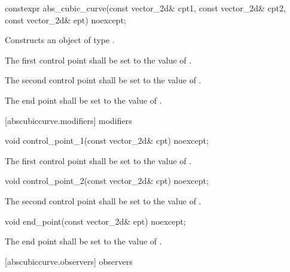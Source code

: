 \begin{itemdecl}
constexpr abs_cubic_curve(const vector_2d& cpt1, const vector_2d& cpt2,
  const vector_2d& ept) noexcept;
\end{itemdecl}
\begin{itemdescr}
\pnum
\effects
Constructs an object of type .

\pnum
The first control point shall be set to the value of .

\pnum
The second control point shall be set to the value of .

\pnum
The end point shall be set to the value of .
\end{itemdescr}

 [abscubiccurve.modifiers]{ modifiers}

\begin{itemdecl}
void control_point_1(const vector_2d& cpt) noexcept;
\end{itemdecl}
\begin{itemdescr}
\pnum
\effects
The first control point shall be set to the value of .
\end{itemdescr}

\begin{itemdecl}
void control_point_2(const vector_2d& cpt) noexcept;
\end{itemdecl}
\begin{itemdescr}
\pnum
\effects
The second control point shall be set to the value of .
\end{itemdescr}

\begin{itemdecl}
void end_point(const vector_2d& ept) noexcept;
\end{itemdecl}
\begin{itemdescr}
\pnum
\effects
The end point shall be set to the value of .
\end{itemdescr}

 [abscubiccurve.observers]{ observers}

